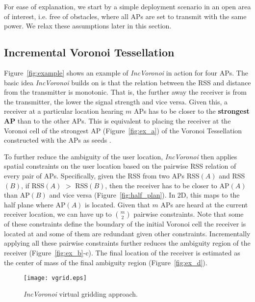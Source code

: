 \documentclass[conference]{IEEEtran}
\def \sys {\textit{IncVoronoi}}
\begin{document}
For ease of explanation, we start by a simple deployment scenario in an open area of interest, i.e. free of obstacles, where all APs 
 are set to transmit with the same power. We relax these assumptions later in this section.
\subsection{Incremental Voronoi Tessellation}
\label{sec:basic_vor}
Figure~\ref{fig:example} shows an example of \sys{} in action for four APs. The basic idea \sys{} builds on is that the relation between the RSS and distance from the transmitter is monotonic. That is, the further away the receiver is from the transmitter, the lower the signal strength and vice versa. Given this, a receiver at a particular location hearing $m$ APs has to be closer to the \textbf{strongest AP} than to the other APs. This is equivalent to placing the receiver at the Voronoi cell of the strongest AP (Figure~\ref{fig:ex_a}) of the Voronoi Tessellation constructed with the APs as seeds \cite{voronoi}.

To further reduce the ambiguity of the user location, \sys{} then applies spatial constraints on the user location based on the pairwise RSS relation of every pair of APs. 
Specifically, given the RSS from two APs RSS$(A)$ and RSS$(B)$, if RSS$(A)$ $>$ RSS$(B)$, then the receiver has to be closer to AP$(A)$ than AP$(B)$ and vice versa (Figure~\ref{fig:half_plan}). In 2D, this maps to the half plane where AP$(A)$ is located. Given that $m$ APs are heard at the current receiver location, we can have up to ${m \choose 2}$ pairwise constraints. Note that some of these constraints define the boundary of the initial Voronoi cell the receiver is located at and some of them are redundant given other constraints.  Incrementally applying all these pairwise constraints further reduces the ambiguity region of the receiver (Figure~\ref{fig:ex_b}-c). The final location of the receiver is estimated as the center of mass of the final ambiguity region (Figure~\ref{fig:ex_d}).
\begin{figure}[!t]
\centering
\texttt{[image: vgrid.eps]}
\caption{\sys{} virtual gridding approach.
} 
\label{fig:vgrid_ill}
\end{figure}
\end{document}
